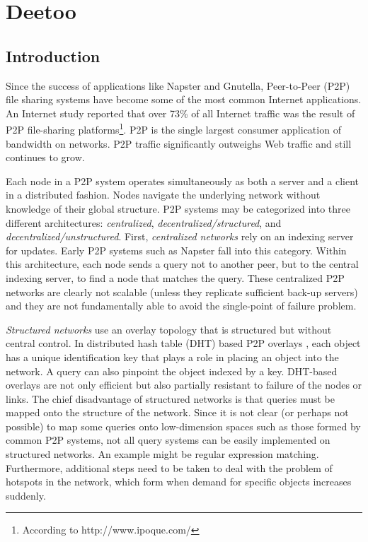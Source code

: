 \chapter{Deetoo}
\section{Introduction}\label{sec:introduction} 
Since the success of applications like 
Napster and Gnutella,
Peer-to-Peer (P2P) file sharing systems have become some of the most
common Internet applications. An Internet study reported
that over 73\% of all Internet traffic was 
the result of P2P file-sharing platforms\footnote{According 
to http://www.ipoque.com/}.
P2P is the single largest consumer application of bandwidth on 
networks. P2P traffic significantly outweighs Web traffic 
and still continues to grow\cite{Goth06b}.

Each node in a P2P system operates simultaneously as both a server and a client
in a distributed fashion. Nodes navigate the
underlying network without knowledge of their global structure. 
P2P systems may be categorized into three
different architectures: \emph{centralized},
\emph{decentralized/structured}, and
\emph{decentralized/unstructured}\cite{LCKS02}. 
First, \emph{centralized networks} rely on an indexing server for updates.
Early P2P systems such as Napster 
fall into this category. Within this architecture, each node sends
a query not to another peer, but to the central indexing server, to find
a node that matches the query. These centralized P2P
networks are clearly not scalable (unless they replicate sufficient back-up
servers) and they are not fundamentally
able to avoid the single-point of failure problem.

\emph{Structured networks} use an overlay topology that is
structured but without central control.
In distributed hash table (DHT) based P2P overlays
\cite{is:Chord,sr:CAN,bz:Tapestry,pr:Symphony}, 
each object has a unique identification 
key that plays a role in placing an object into the network. 
A query can also pinpoint the object indexed by 
a key. DHT-based overlays are not only efficient but also partially 
resistant to failure of the nodes or links. 
The chief disadvantage of structured networks is that queries must be
mapped onto the structure of the network.  Since it is not clear (or
perhaps not possible) to map some queries onto low-dimension spaces
such as those formed by common P2P systems, not all query systems can
be easily implemented on structured networks.  An example might be
regular expression matching.  Furthermore, additional steps need
to be taken to deal with the problem of hotspots in the network, 
which form when demand for specific objects increases suddenly.

